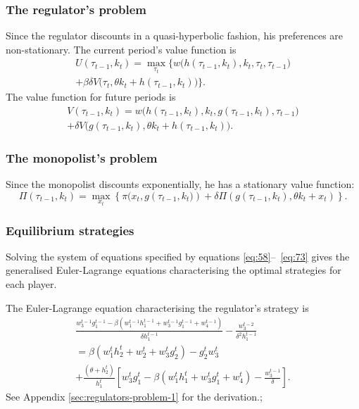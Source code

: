 \subsubsection{The regulator's problem}
\label{sec:regulators-problem}

Since the regulator discounts in a quasi-hyperbolic fashion, his
preferences are non-stationary. The current period's value function is
\begin{multline}
  \label{eq:58} U(\tau_{t-1},k_t) = \max_{\tau_t} \bigg\{ w\big(
    h(\tau_{t-1},k_t),k_t,\tau_t,\tau_{t-1}\big) \\+ \beta\delta V
  \big( \tau_t,\theta k_t + h(\tau_{t-1},k_t) \big) \bigg\}.
\end{multline}
The value function for future periods is
\begin{multline}
  \label{eq:59}  V(\tau_{t-1},k_t) = w\big(
  h(\tau_{t-1},k_t),k_t,g(\tau_{t-1},k_t),\tau_{t-1}\big) \\ +
  \delta V \big( g(\tau_{t-1},k_t),\theta k_t + h(\tau_{t-1},k_t)
  \big).
\end{multline}

\subsubsection{The monopolist's problem}
\label{sec:monopolists-problem}

Since the monopolist discounts exponentially, he has a stationary
value function:
\begin{equation}
\label{eq:73}
  \Pi(\tau_{t-1},k_t) = \max_{x_t} \left\{
    \pi(x_t,g\left(\tau_{t-1},k_t)\right) + \delta \Pi \left(
      g(\tau_{t-1},k_t), \theta k_t + x_t \right) \right\}.
\end{equation}

\subsubsection{Equilibrium strategies}
\label{sec:equil-strat-1}

Solving the system of equations specified by equations
\eqref{eq:58}--~\eqref{eq:73} gives the generalised Euler-Lagrange
equations characterising the optimal strategies for each player.

The Euler-Lagrange equation characterising the regulator's strategy is
\begin{multline}
  \label{eq:30}
  \frac{w^{t-1}_3g^{t-1}_1 - \beta\left( w^{t-1}_1h^{t-1}_1 +
      w^{t-1}_3g^{t-1}_1 + w^{t-1}_4 \right)}{\delta h^{t-1}_1}  -
  \frac{w^{t-2}_3}{\delta^2 h^{t-1}_1} \\=
  \beta ( w^t_1h^t_2 + w^t_2 + w^t_3g^t_2 ) - g^t_2w^t_3 \\
  +\frac{\left( \theta + h^t_2 \right)}{h^t_1} \left[ w^t_3g^t_1 -
    \beta\left( w^t_1h^t_1 + w^t_3g^t_1 + w^t_4 \right) -
    \frac{w^{t-1}_3}{\delta} \right].
\end{multline}
See Appendix \ref{sec:regulators-problem-1} for the derivation.;

